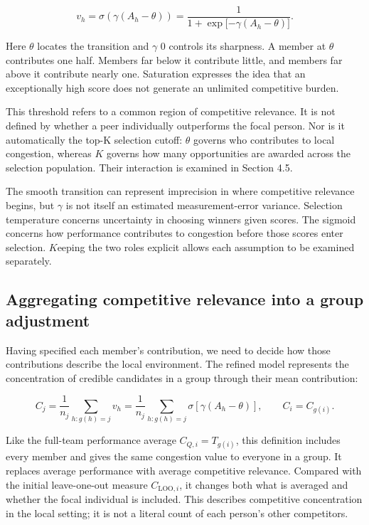 \[
v_{h} = \sigma(\gamma(A_{h} - \theta)) = \frac{1}{1 + \exp\lbrack - \gamma(A_{h} - \theta)\rbrack}.
\]

Here \(\theta\) locates the transition and \(\gamma\) 0 controls its sharpness. A member at \(\theta\) contributes one half. Members far below it contribute little, and members far above it contribute nearly one. Saturation expresses the idea that an exceptionally high score does not generate an unlimited competitive burden.

This threshold refers to a common region of competitive relevance. It is not defined by whether a peer individually outperforms the focal person. Nor is it automatically the top-K selection cutoff: \(\theta\) governs who contributes to local congestion, whereas \(K\) governs how many opportunities are awarded across the selection population. Their interaction is examined in Section 4.5.

The smooth transition can represent imprecision in where competitive relevance begins, but \(\gamma\) is not itself an estimated measurement-error variance. Selection temperature concerns uncertainty in choosing winners given scores. The sigmoid concerns how performance contributes to congestion before those scores enter selection. \(K\)eeping the two roles explicit allows each assumption to be examined separately.

\subsection{Aggregating competitive relevance into a group adjustment}\label{aggregating-competitive-relevance-into-a-group-adjustment}

Having specified each member's contribution, we need to decide how those contributions describe the local environment. The refined model represents the concentration of credible candidates in a group through their mean contribution:

\[
C_j=\frac{1}{n_j}\sum_{h:g(h)=j}v_h
=\frac{1}{n_j}\sum_{h:g(h)=j}\sigma\!\left[\gamma(A_h-\theta)\right],
\qquad C_i=C_{g(i)}.
\]

Like the full-team performance average \(C_{Q,i}=T_{g(i)}\), this definition includes every member and gives the same congestion value to everyone in a group. It replaces average performance with average competitive relevance. Compared with the initial leave-one-out measure \(C_{\mathrm{LOO},i}\), it changes both what is averaged and whether the focal individual is included. This describes competitive concentration in the local setting; it is not a literal count of each person's other competitors.

